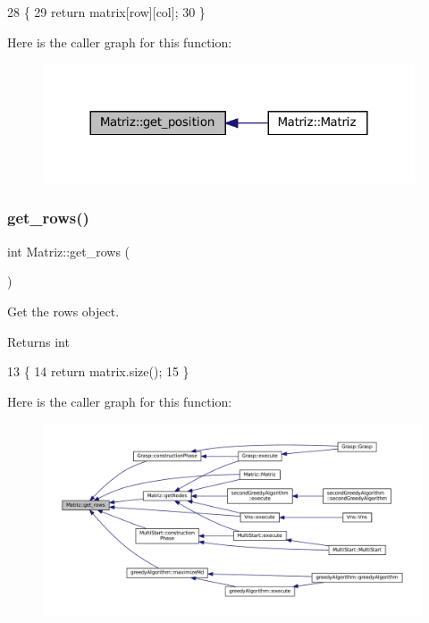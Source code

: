 \begin{DoxyCode}
28 \{
29   \textcolor{keywordflow}{return} matrix[row][col];
30 \}
\end{DoxyCode}
Here is the caller graph for this function\+:\nopagebreak
\begin{figure}[H]
\begin{center}
\leavevmode
\includegraphics[width=312pt]{classMatriz_a1894d8447d3ae6992a43e46f93422b88_icgraph}
\end{center}
\end{figure}
\mbox{\label{classMatriz_a6b18342f8c083baece693ff41185a206}} 
\subsubsection{\texorpdfstring{get\+\_\+rows()}{get\_rows()}}
{\footnotesize\ttfamily int Matriz\+::get\+\_\+rows (\begin{DoxyParamCaption}{ }\end{DoxyParamCaption})}



Get the rows object. 

\begin{DoxyReturn}{Returns}
int 
\end{DoxyReturn}

\begin{DoxyCode}
13 \{
14   \textcolor{keywordflow}{return} matrix.size();
15 \}
\end{DoxyCode}
Here is the caller graph for this function\+:\nopagebreak
\begin{figure}[H]
\begin{center}
\leavevmode
\includegraphics[width=350pt]{classMatriz_a6b18342f8c083baece693ff41185a206_icgraph}
\end{center}
\end{figure}
\mbox{\label{classMatriz_a8df14a27d791f24206dd633b2a685c5b}} 

